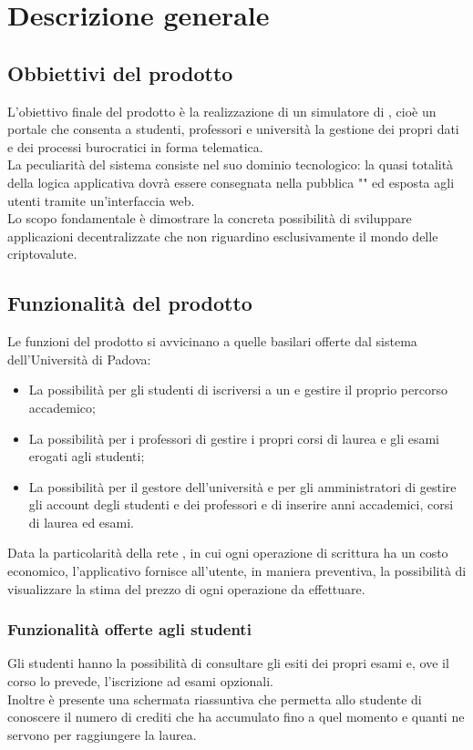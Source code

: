 \documentclass[AnalisiDeiRequisiti.tex]{subfiles}
\begin{document}
\chapter{Descrizione generale}
\section{Obbiettivi del prodotto}
L'obiettivo finale del prodotto è la realizzazione di un simulatore di , cioè un portale che consenta a studenti, professori e università la gestione dei propri dati e dei processi burocratici in forma telematica. \\
La peculiarità del sistema consiste nel suo dominio tecnologico: la quasi totalità della logica applicativa dovrà essere consegnata nella  pubblica "" ed esposta agli utenti tramite un'interfaccia web. \\
Lo scopo fondamentale è dimostrare la concreta possibilità di sviluppare applicazioni decentralizzate che non riguardino esclusivamente il mondo delle criptovalute.

\section{Funzionalità del prodotto}
Le funzioni del prodotto si avvicinano a quelle basilari offerte dal sistema  dell'Università di Padova:
\begin{itemize}
	\item La possibilità per gli studenti di iscriversi a un  e gestire il proprio percorso accademico;
	\item La possibilità per i professori di gestire i propri corsi di laurea e gli esami erogati agli studenti;
	\item La possibilità per il gestore dell'università e per gli amministratori di gestire gli account degli studenti e dei professori e di inserire anni accademici, corsi di laurea ed esami.
\end{itemize}
Data la particolarità della rete , in cui ogni operazione di scrittura ha un costo economico, l'applicativo fornisce all'utente, in maniera preventiva, la possibilità di visualizzare la stima del prezzo di ogni operazione da effettuare.

\subsection{Funzionalità offerte agli studenti}
Gli studenti hanno la possibilità di consultare gli esiti dei propri esami e, ove il corso lo prevede, l'iscrizione ad esami opzionali.\\
Inoltre è presente una schermata riassuntiva che permetta allo studente di conoscere il numero di crediti che ha accumulato fino a quel momento e quanti ne servono per raggiungere la laurea.
\end{document}
